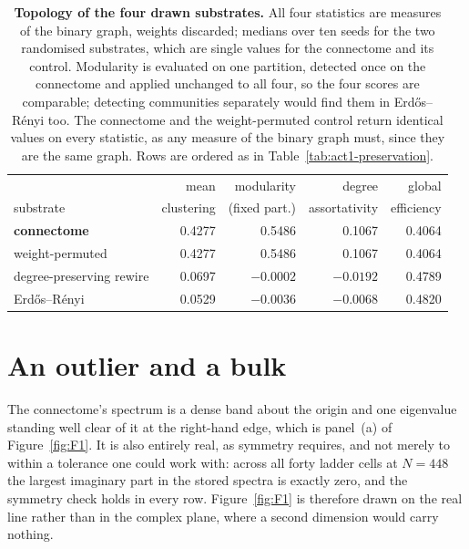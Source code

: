 \begin{table}[ht]
    \centering
    \caption[Topology of the four substrates]{\textbf{Topology of the four
    drawn substrates.} All four statistics are measures of the binary graph,
    weights discarded; medians over ten seeds for the two randomised
    substrates, which are single values for the connectome and its control.
    Modularity is evaluated on one partition, detected once on the connectome
    and applied unchanged to all four, so the four scores are comparable;
    detecting communities separately would find them in Erdős–Rényi too. The
    connectome and the weight-permuted control return identical values on every
    statistic, as any measure of the binary graph must, since they are the same
    graph. Rows are ordered as in Table~\ref{tab:act1-preservation}.}
    \label{tab:act1-topology}
    \begin{tabular}{lrrrr}
        \toprule
        & mean & modularity & degree & global \\
        substrate & clustering & (fixed part.) & assortativity & efficiency \\
        \midrule
        \textbf{connectome} & 0.4277 & 0.5486 & 0.1067 & 0.4064 \\ %
        weight-permuted & 0.4277 & 0.5486 & 0.1067 & 0.4064 \\ %
        degree-preserving rewire & 0.0697 & $-0.0002$ & $-0.0192$ & 0.4789 \\ %
        Erdős–Rényi & 0.0529 & $-0.0036$ & $-0.0068$ & 0.4820 \\ %
        \bottomrule
    \end{tabular}
\end{table}



\section{An outlier and a bulk}
\label{sec:act1-spectrum}
\bigskip

The connectome's spectrum is a dense band about the origin and one eigenvalue
standing well clear of it at the right-hand edge, which is panel~(a) of
Figure~\ref{fig:F1}. It is also entirely real, as symmetry requires, and not
merely to within a tolerance one could work with: across all forty ladder cells
at $N = 448$ the largest imaginary part in the stored spectra is exactly
zero, %
and the symmetry check holds in every row. %
Figure~\ref{fig:F1} is therefore drawn on the real line rather than in the
complex plane, where a second dimension would carry nothing.

